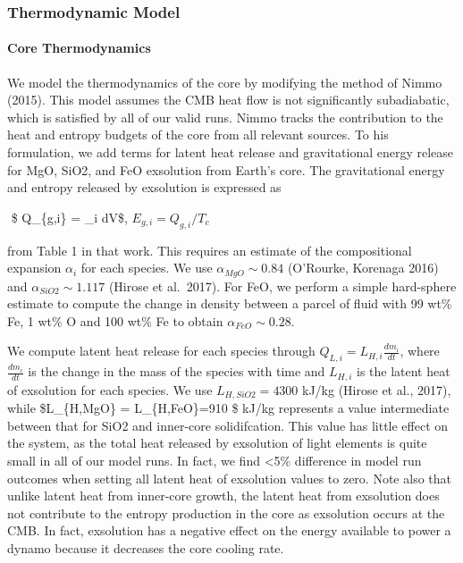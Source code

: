\documentclass[]{article}
\let\oldparagraph\paragraph
\renewcommand{\paragraph}[1]{\oldparagraph{#1}\mbox{}}
\begin{document}
\hypertarget{thermodynamic-model}{%
\subsubsection{Thermodynamic Model}\label{thermodynamic-model}}

\hypertarget{core-thermodynamics}{%
\paragraph{Core Thermodynamics}\label{core-thermodynamics}}

We model the thermodynamics of the core by modifying the method of Nimmo
(2015). This model assumes the CMB heat flow is not significantly
subadiabatic, which is satisfied by all of our valid runs. Nimmo tracks
the contribution to the heat and entropy budgets of the core from all
relevant sources. To his formulation, we add terms for latent heat
release and gravitational energy release for MgO, SiO2, and FeO
exsolution from Earth's core. The gravitational energy and entropy
released by exsolution is expressed as

​ \$ Q\_\{g,i\} = \int \rho \psi \alpha\_i dV\$,
\(E_{g,i} = Q_{g,i}/T_c\)

from Table 1 in that work. This requires an estimate of the
compositional expansion \(\alpha_i\) for each species. We use
\(\alpha_{MgO}\sim0.84\) (O'Rourke, Korenaga 2016) and
\(\alpha_{SiO2}\sim1.117\) (Hirose et al.~2017). For FeO, we perform a
simple hard-sphere estimate to compute the change in density between a
parcel of fluid with 99 wt\% Fe, 1 wt\% O and 100 wt\% Fe to obtain
\(\alpha_{FeO} \sim 0.28\).

We compute latent heat release for each species through
\(Q_{L,i} = L_{H,i}\frac{dm_i}{dt}\), where \(\frac{dm_i}{dt}\) is the
change in the mass of the species with time and \(L_{H,i}\) is the
latent heat of exsolution for each species. We use \(L_{H,SiO2} = 4300\)
kJ/kg (Hirose et al., 2017), while \$L\_\{H,MgO\} = L\_\{H,FeO\}=910 \$
kJ/kg represents a value intermediate between that for SiO2 and
inner-core solidifcation. This value has little effect on the system, as
the total heat released by exsolution of light elements is quite small
in all of our model runs. In fact, we find \textless{}5\% difference in
model run outcomes when setting all latent heat of exsolution values to
zero. Note also that unlike latent heat from inner-core growth, the
latent heat from exsolution does not contribute to the entropy
production in the core as exsolution occurs at the CMB. In fact,
exsolution has a negative effect on the energy available to power a
dynamo because it decreases the core cooling rate.
\end{document}
